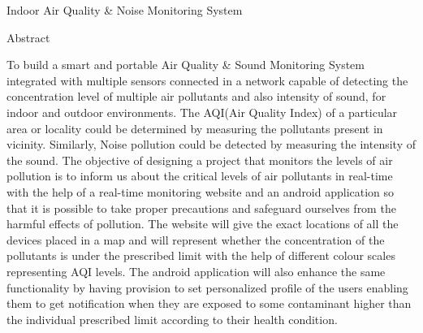 \newpage\begin{center}
\huge{Indoor Air Quality \& Noise Monitoring System} %
\end{center}
\begin{center}
\Large{Abstract}\\
\end{center}

\normalsize

To build a smart and portable Air Quality \& Sound Monitoring System integrated with multiple sensors connected in a network capable of detecting the concentration level of multiple air pollutants and also intensity of sound, for indoor and outdoor environments. The AQI(Air Quality Index) of a particular area or locality could be determined by measuring the pollutants present in vicinity. Similarly, Noise pollution could be detected by measuring the intensity of the sound. The objective of designing a project that monitors the levels of air pollution is to inform us about the critical levels of air pollutants in real-time with the help of a real-time monitoring website and an android application so that it is possible to take proper precautions and safeguard ourselves from the harmful effects of pollution. The website will give the exact locations of all the devices placed in a map and will represent whether the concentration of the pollutants is under the prescribed limit with the help of different colour scales representing AQI levels. The android application will also enhance the same functionality by having provision to set personalized profile of the users enabling them to get notification when they are exposed to some contaminant higher than the individual prescribed limit according to their health condition. 
 
 